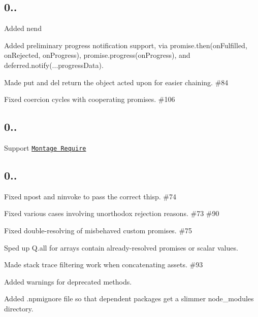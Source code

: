 \subsection*{0..}


\begin{DoxyItemize}
\item Added {\ttfamily nend}
\item Added preliminary progress notification support, via {\ttfamily promise.\+then(on\+Fulfilled, on\+Rejected, on\+Progress)}, {\ttfamily promise.\+progress(on\+Progress)}, and {\ttfamily deferred.\+notify(...progress\+Data)}.
\item Made {\ttfamily put} and {\ttfamily del} return the object acted upon for easier chaining. \#84
\item Fixed coercion cycles with cooperating promises. \#106
\end{DoxyItemize}

\subsection*{0..}


\begin{DoxyItemize}
\item Support \href{http://github.com/kriskowal/mr}{\tt Montage Require}
\end{DoxyItemize}

\subsection*{0..}


\begin{DoxyItemize}
\item Fixed {\ttfamily npost} and {\ttfamily ninvoke} to pass the correct {\ttfamily thisp}. \#74
\item Fixed various cases involving unorthodox rejection reasons. \#73 \#90 
\item Fixed double-\/resolving of misbehaved custom promises. \#75
\item Sped up {\ttfamily Q.\+all} for arrays contain already-\/resolved promises or scalar values. 
\item Made stack trace filtering work when concatenating assets. \#93 
\item Added warnings for deprecated methods. 
\item Added {\ttfamily .npmignore} file so that dependent packages get a slimmer {\ttfamily node\+\_\+modules} directory.
\end{DoxyItemize}

